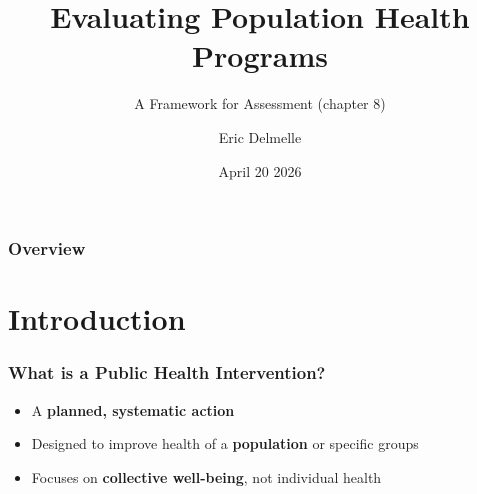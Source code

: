 \documentclass{beamer}
\title{Evaluating Population Health Programs}
\subtitle{A Framework for Assessment (chapter 8)}
\author{Eric Delmelle}
\date{April 20 2026}
\begin{document}
\begin{frame}
\titlepage
\end{frame}

\begin{frame}
\frametitle{Overview}
\tableofcontents
\end{frame}

\section{Introduction}

\begin{frame}
\frametitle{What is a Public Health Intervention?}
\begin{itemize}
    \item A \textbf{planned, systematic action}
    \item Designed to improve health of a \textbf{population} or specific groups
    \item Focuses on \textbf{collective well-being}, not individual health
\end{itemize}

\vspace{0.5cm}
\begin{center}
\end{center}
\end{frame}
\end{document}
